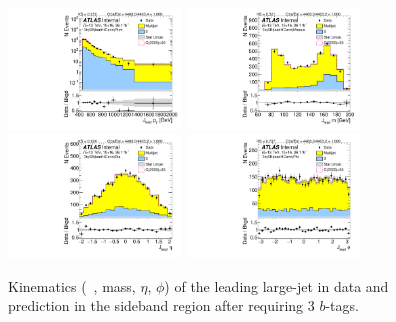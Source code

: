 \clearpage

\begin{figure}[htb!]
\begin{center}
\includegraphics[width=0.41\textwidth,angle=-90]{figures/boosted/Sideband/b77_ThreeTag_Sideband_leadHCand_Pt_m_1.pdf}
\includegraphics[width=0.41\textwidth,angle=-90]{figures/boosted/Sideband/b77_ThreeTag_Sideband_leadHCand_Mass_s.pdf}\\
\includegraphics[width=0.41\textwidth,angle=-90]{figures/boosted/Sideband/b77_ThreeTag_Sideband_leadHCand_Eta.pdf}
\includegraphics[width=0.41\textwidth,angle=-90]{figures/boosted/Sideband/b77_ThreeTag_Sideband_leadHCand_Phi.pdf}
  \caption{Kinematics (\pt~, mass, $\eta$, $\phi$) of the leading large-\R jet in data and prediction in the sideband region after requiring 3 $b$-tags.}
  \label{fig:boosted-3b-sideband-ak10-lead}
\end{center}
\end{figure}


